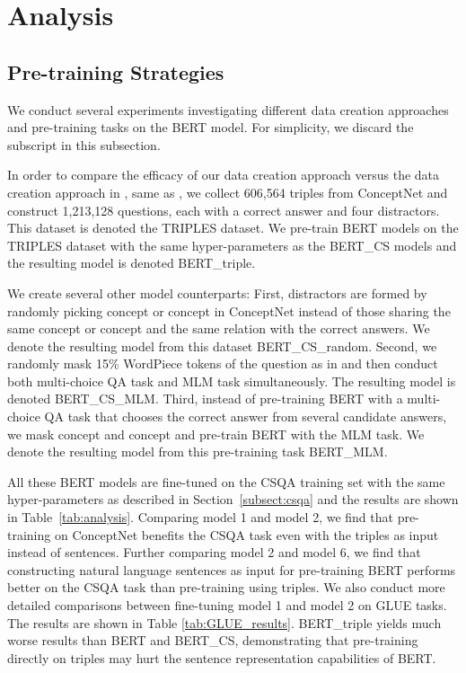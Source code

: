 \documentclass[11pt,a4paper]{article}
\begin{document}
\section{Analysis}
\subsection{Pre-training Strategies}
We conduct several experiments investigating different data creation approaches and pre-training tasks on the BERT model.
For simplicity, we discard the subscript  in this subsection.

In order to compare the efficacy of our data creation approach versus the data creation approach in \citet{sun2019probing},
same as \citet{sun2019probing}, we collect 606,564 triples from ConceptNet and construct 1,213,128 questions, each with a correct answer and four distractors. This dataset is denoted the TRIPLES dataset.
We pre-train BERT models on the TRIPLES dataset with the same hyper-parameters as the BERT\_CS models and the resulting model is denoted BERT\_triple.

We create several other model counterparts:
First, distractors are formed by randomly picking concept or concept in ConceptNet instead of those sharing the same concept or concept and the same relation with the correct answers. We denote the resulting model from this dataset BERT\_CS\_random.
Second, we randomly mask 15\% WordPiece tokens \citep{wu2016google} of the question as in \citet{devlin-etal-2019-bert} and then conduct both multi-choice QA task and MLM task simultaneously.  The resulting model is denoted BERT\_CS\_MLM.
Third, instead of pre-training BERT with a multi-choice QA task that chooses the correct answer from several candidate answers, we mask concept and concept and pre-train BERT with the MLM task. We denote the resulting model from this pre-training task BERT\_MLM.



All these BERT models are fine-tuned on the CSQA training set with the same hyper-parameters as described in Section~\ref{subsect:csqa} and the results are shown in Table~\ref{tab:analysis}.
Comparing model 1 and model 2, we find that pre-training on ConceptNet benefits the CSQA task even with the triples as input instead of sentences. 
Further comparing model 2 and model 6, we find that constructing natural language sentences as input for pre-training BERT performs better on the CSQA task than pre-training using triples. 
We also conduct more detailed comparisons between fine-tuning model 1 and model 2 on GLUE tasks. 
The results are shown in Table \ref{tab:GLUE_results}.
BERT\_triple yields much worse results than BERT and BERT\_CS, demonstrating that pre-training directly on triples may hurt the sentence representation capabilities of BERT. 
\end{document}
